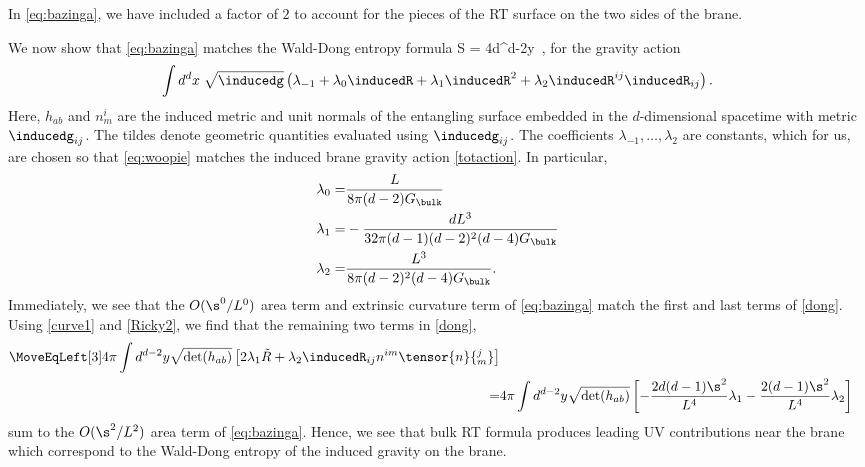 In \eqref{eq:bazinga}, we have included a factor of $2$ to account for the pieces of the RT surface on the two sides of the brane.

We now show that \eqref{eq:bazinga} matches the Wald-Dong entropy formula \cite{Dong:2013qoa}
\beq\label{dong}
S = 4\pi \int d^{d-2}y 
\,,
\eeq
for the gravity action
\begin{align}
  \int d^d x\; \sqrt{\inducedg} \left(
  \lambda_{-1} + \lambda_0 \inducedR + \lambda_1 \inducedR^2
  +\lambda_2 \inducedR^{ij} \inducedR_{ij}
  \right).
  \label{eq:woopie}
\end{align}
Here, $h_{ab}$ and $n^i_m$ are the induced metric and unit normals of the entangling surface embedded in the $d$-dimensional spacetime with metric $\inducedg_{ij}$. The tildes denote geometric quantities evaluated using $\inducedg_{ij}$. The coefficients $\lambda_{-1},\ldots,\lambda_2$ are constants, which for us, are chosen so that \eqref{eq:woopie} matches the induced brane gravity action \eqref{totaction}. In particular,
\begin{align}
  \lambda_0
  =& \frac{L}{8\pi (d-2) G_\bulk}
  \\
  \lambda_1
  =& -\frac{d L^3}{32 \pi (d-1)(d-2)^2(d-4) G_\bulk}
  \\
  \lambda_2
  =& \frac{L^3}{8\pi (d-2)^2 (d-4) G_\bulk}.
\end{align}
Immediately, we see that the $O(\s^0/L^0)$ area term and extrinsic curvature term of \eqref{eq:bazinga} match the first and last terms of \eqref{dong}. Using \eqref{curve1} and \eqref{Ricky2}, we find that the remaining two terms in \eqref{dong},
\begin{align}
  \MoveEqLeft[3]4\pi \int d^{d-2}y \sqrt{\det(h_{ab})}
  \left[
  2 \lambda_1 \tilde{R}
  +\lambda_2
  \inducedR_{ij} n^{im} \tensor{n}{^j_m}
  \right]
  \\
  =& 4\pi \int d^{d-2}y \sqrt{\det(h_{ab})}
  \left[
  -\frac{2d(d-1)\s^2}{L^4} \lambda_1
  -\frac{2(d-1)\s^2}{L^4} \lambda_2
  \right]
\end{align}
sum to the $O(\s^2/L^2)$ area term of \eqref{eq:bazinga}. Hence, we see that bulk RT formula produces leading UV contributions near the brane which correspond to the Wald-Dong entropy of the induced gravity on the brane.

